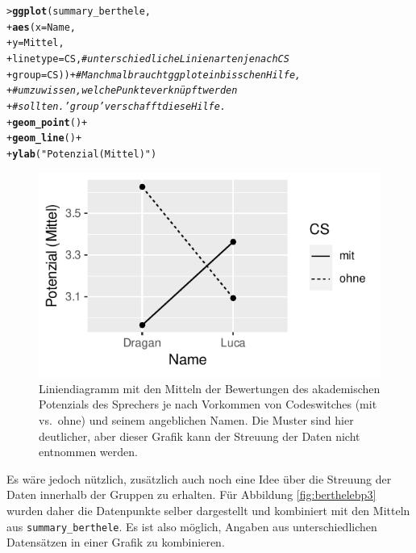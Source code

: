 \documentclass[oneside, 10pt]{book}\usepackage[]{graphicx}\usepackage[]{xcolor}
\makeatletter
\newcommand{\hlstr}[1]{\textcolor[rgb]{0.192,0.494,0.8}{#1}}%
\newcommand{\hlcom}[1]{\textcolor[rgb]{0.678,0.584,0.686}{\textit{#1}}}%
\newcommand{\hlopt}[1]{\textcolor[rgb]{0,0,0}{#1}}%
\newcommand{\hlstd}[1]{\textcolor[rgb]{0.345,0.345,0.345}{#1}}%
\newcommand{\hlkwc}[1]{\textcolor[rgb]{0.333,0.667,0.333}{#1}}%
\newcommand{\hlkwd}[1]{\textcolor[rgb]{0.737,0.353,0.396}{\textbf{#1}}}%
\newenvironment{kframe}{%
 \def\at@end@of@kframe{}%
 \ifinner\ifhmode%
  \def\at@end@of@kframe{\end{minipage}}%
  \begin{minipage}{\columnwidth}%
 \fi\fi%
 \def\FrameCommand##1{\hskip\@totalleftmargin \hskip-\fboxsep
 \colorbox{shadecolor}{##1}\hskip-\fboxsep
     \hskip-\linewidth \hskip-\@totalleftmargin \hskip\columnwidth}%
 \MakeFramed {\advance\hsize-\width
   \@totalleftmargin\z@ \linewidth\hsize
   \@setminipage}}%
 {\par\unskip\endMakeFramed%
 \at@end@of@kframe}
\newenvironment{knitrout}{}{} %
\makeatother
\begin{document}
\begin{knitrout}
\color{fgcolor}\begin{kframe}
\begin{alltt}
\hlstd{> }\hlkwd{ggplot}\hlstd{(summary_berthele,}
\hlstd{+ }       \hlkwd{aes}\hlstd{(}\hlkwc{x} \hlstd{= Name,}
\hlstd{+ }           \hlkwc{y} \hlstd{= Mittel,}
\hlstd{+ }           \hlkwc{linetype} \hlstd{= CS,}  \hlcom{# unterschiedliche Linienarten je nach CS}
\hlstd{+ }           \hlkwc{group} \hlstd{= CS))} \hlopt{+}  \hlcom{# Manchmal braucht ggplot ein bisschen Hilfe,}
\hlstd{+ }                           \hlcom{# um zu wissen, welche Punkte verknüpft werden}
\hlstd{+ }                           \hlcom{# sollten. 'group' verschafft diese Hilfe.}
\hlstd{+ }  \hlkwd{geom_point}\hlstd{()} \hlopt{+}
\hlstd{+ }  \hlkwd{geom_line}\hlstd{()} \hlopt{+}
\hlstd{+ }  \hlkwd{ylab}\hlstd{(}\hlstr{"Potenzial (Mittel)"}\hlstd{)}
\end{alltt}
\end{kframe}\begin{figure}[tp]

{\centering \includegraphics[width=.5\textwidth]{figs/unnamed-chunk-274-1} 

}

\caption{Liniendiagramm mit den Mitteln der Bewertungen des akademischen Potenzials des Sprechers je nach Vorkommen von Codeswitches (mit vs.\ ohne) und seinem angeblichen Namen. Die Muster sind hier deutlicher, aber dieser Grafik kann der Streuung der Daten nicht entnommen werden.\label{fig:berthelebp2}}\label{fig:unnamed-chunk-274}
\end{figure}

\end{knitrout}

Es wäre jedoch nützlich, zusätzlich auch noch eine Idee über die Streuung der Daten
innerhalb der Gruppen zu erhalten. Für Abbildung \ref{fig:berthelebp3} wurden daher
die Datenpunkte selber dargestellt und kombiniert mit den Mitteln aus
\texttt{summary\_berthele}. Es ist also möglich, Angaben
aus unterschiedlichen Datensätzen in einer Grafik zu kombinieren.
\end{document}
